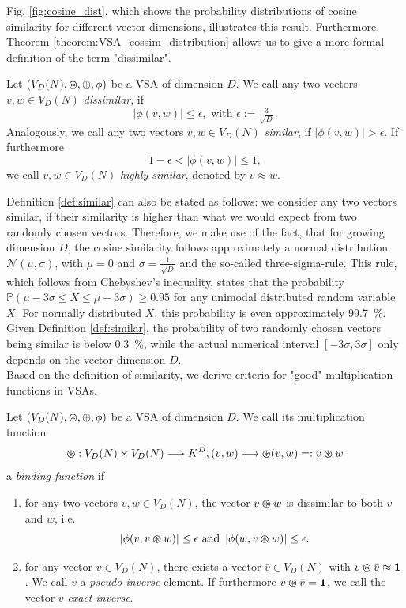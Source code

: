 Fig. \ref{fig:cosine_dist}, which shows the probability distributions of cosine similarity for different vector dimensions, illustrates this result. 
Furthermore, Theorem \ref{theorem:VSA_cossim_distribution} allows us to give a more formal definition of the term "dissimilar".
\begin{defn}
	\label{def:similar}
	Let $(V_{D}(N), \varoast, \oplus, \phi)$ be a \acrfull{VSA} of dimension $D$. We call any two vectors $v, w \in V_{D}(N)$ \emph{dissimilar}, if 
	\[ 
	\left| \phi(v,w) \right| \leq \epsilon, \textrm{ with } \epsilon:=\tfrac{3}{\sqrt{D}}.
	\]
	Analogously, we call any two vectors $v, w \in V_{D}(N)$ \emph{similar}, if	$\left| \phi(v,w) \right| > \epsilon$. 
	If furthermore 	
	\[
	1-\epsilon < \left| \phi(v,w) \right| \leq 1,
	\]
	we call $v, w \in V_{D}(N)$ \emph{highly similar}, denoted by $v \approx w$.
\end{defn}
Definition \ref{def:similar} can also be stated as follows: we consider any two vectors similar, if their similarity is higher than what we would expect from two randomly chosen vectors.
Therefore, we make use of the fact, that for growing dimension $D$, the cosine similarity follows approximately a normal distribution $\mathcal{N}\left(\mu, \sigma\right)$, with $\mu=0$ and $\sigma=\tfrac{1}{\sqrt{D}}$ and the so-called three-sigma-rule.
This rule, which follows from Chebyshev's inequality, states that the probability $\mathbb{P}\left(\mu-3\sigma \leq X \leq \mu+3\sigma \right) \geq 0.95$ for any unimodal distributed random variable $X$.
For normally distributed $X$, this probability is even approximately \SI{99.7}{\percent}.
Given Definition \ref{def:similar}, the probability of two randomly chosen vectors being similar is below \SI{0.3}{\percent}, while the actual numerical interval $\left[-3\sigma, 3\sigma\right]$ only depends on the vector dimension $D$.\\
Based on the definition of similarity, we derive criteria for "good" multiplication functions in \acp{VSA}.
\begin{defn}
	\label{def:binding}
	Let $(V_{D}(N), \varoast, \oplus, \phi)$ be a \acrfull{VSA} of dimension $D$. We call its multiplication function 
	\[\varoast: V_{D}(N) \times V_{D}(N) \longrightarrow K^{D}, (v,w) \longmapsto \varoast(v,w) =: v\varoast w\]
	a \emph{binding function} if 
	\begin{enumerate}
		\item for any two vectors $v, w \in V_{D}(N)$, the vector $v \varoast w$ is dissimilar to both $v$ and $w$, i.e.
		\[
		\left| \phi(v,v \varoast w) \right| \leq \epsilon \textrm{ and } \left| \phi(w,v \varoast w) \right| \leq \epsilon.
		\]
		\item for any vector $v \in V_{D}(N)$, there exists a vector $\bar{v} \in V_{D}(N)$ with $v \varoast \bar{v} \approx \bf{1}$. We call $\bar{v}$ a \emph{pseudo-inverse} element. 
		If furthermore $v \varoast \bar{v} = \bf{1}$, we call the vector $\bar{v}$ \emph{exact inverse}.
	\end{enumerate}
\end{defn}
